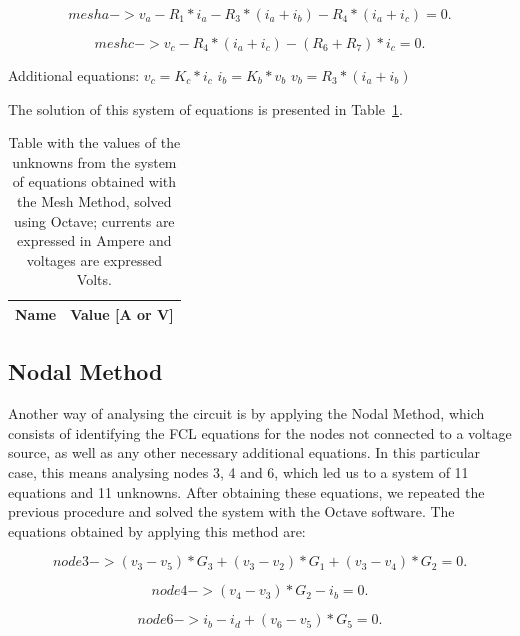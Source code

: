\begin{equation}
  mesh a -> v_a - R_1*i_a - R_3*(i_a + i_b) - R_4*(i_a +i_c) = 0.
\end{equation}

\begin{equation}
  mesh c -> v_c - R_4*(i_a +i_c) - (R_6 +R_7)*i_c = 0.
\end{equation}

Additional equations:
$v_c = K_c*i_c$
$i_b = K_b*v_b$
$v_b = R_3*(i_a + i_b)$

The solution of this system of equations is presented in Table~\ref{tab:node}. 

\begin{table}[h]
  \centering
  \begin{tabular}{|l|r|}
    \hline    
    {\bf Name} & {\bf Value [A or V]} \\ \hline
    
  \end{tabular}
  \caption{Table with the values of the unknowns from the system of equations obtained with the Mesh Method, solved using Octave; currents are expressed in Ampere and voltages are expressed Volts.}
  \label{tab:node}
\end{table}


\subsection{Nodal Method}

Another way of analysing the circuit is by applying the Nodal Method, which consists of identifying the FCL equations for the nodes not connected to a voltage source, as well as any other necessary additional equations. In this particular case, this means analysing nodes 3, 4 and 6, which led us to a system of 11 equations and 11 unknowns. After obtaining these equations, we repeated the previous procedure and solved the system with the Octave software. The equations obtained by applying this method are:


\begin{equation}
  node 3 -> (v_3 - v_5)*G_3 + (v_3 - v_2)*G_1 + (v_3 - v_4)*G_2 = 0.
  \label{eq:kvl}
\end{equation}

\begin{equation}
  node 4 -> (v_4 - v_3)*G_2 - i_b = 0.
\end{equation}

\begin{equation}
  node 6 -> i_b - i_d + (v_6 - v_5)*G_5 = 0.
  \label{eq:kvl2}
\end{equation}

